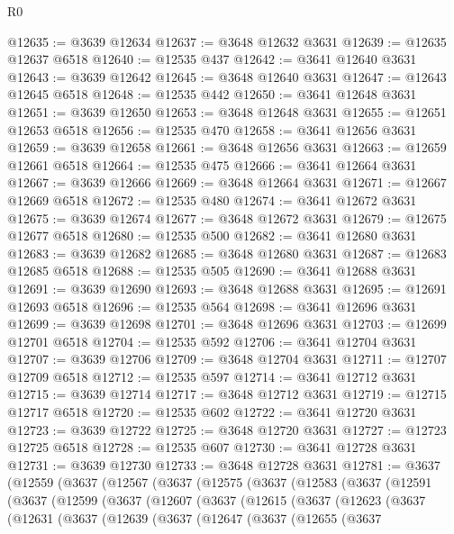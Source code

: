 \begin{lexlean}{R0}
\begin{coremodule}
@12635 := @3639 @12634
@12637 := @3648 @12632 @3631
@12639 := @12635 @12637 @6518
@12640 := @12535 @437
@12642 := @3641 @12640 @3631
@12643 := @3639 @12642
@12645 := @3648 @12640 @3631
@12647 := @12643 @12645 @6518
@12648 := @12535 @442
@12650 := @3641 @12648 @3631
@12651 := @3639 @12650
@12653 := @3648 @12648 @3631
@12655 := @12651 @12653 @6518
@12656 := @12535 @470
@12658 := @3641 @12656 @3631
@12659 := @3639 @12658
@12661 := @3648 @12656 @3631
@12663 := @12659 @12661 @6518
@12664 := @12535 @475
@12666 := @3641 @12664 @3631
@12667 := @3639 @12666
@12669 := @3648 @12664 @3631
@12671 := @12667 @12669 @6518
@12672 := @12535 @480
@12674 := @3641 @12672 @3631
@12675 := @3639 @12674
@12677 := @3648 @12672 @3631
@12679 := @12675 @12677 @6518
@12680 := @12535 @500
@12682 := @3641 @12680 @3631
@12683 := @3639 @12682
@12685 := @3648 @12680 @3631
@12687 := @12683 @12685 @6518
@12688 := @12535 @505
@12690 := @3641 @12688 @3631
@12691 := @3639 @12690
@12693 := @3648 @12688 @3631
@12695 := @12691 @12693 @6518
@12696 := @12535 @564
@12698 := @3641 @12696 @3631
@12699 := @3639 @12698
@12701 := @3648 @12696 @3631
@12703 := @12699 @12701 @6518
@12704 := @12535 @592
@12706 := @3641 @12704 @3631
@12707 := @3639 @12706
@12709 := @3648 @12704 @3631
@12711 := @12707 @12709 @6518
@12712 := @12535 @597
@12714 := @3641 @12712 @3631
@12715 := @3639 @12714
@12717 := @3648 @12712 @3631
@12719 := @12715 @12717 @6518
@12720 := @12535 @602
@12722 := @3641 @12720 @3631
@12723 := @3639 @12722
@12725 := @3648 @12720 @3631
@12727 := @12723 @12725 @6518
@12728 := @12535 @607
@12730 := @3641 @12728 @3631
@12731 := @3639 @12730
@12733 := @3648 @12728 @3631
@12781 := @3637
    (@12559
      (@3637
        (@12567
          (@3637
            (@12575
              (@3637
                (@12583
                  (@3637
                    (@12591
                      (@3637
                        (@12599
                          (@3637
                            (@12607
                              (@3637
                                (@12615
                                  (@3637
                                    (@12623
                                      (@3637
                                        (@12631
                                          (@3637
                                            (@12639
                                              (@3637
                                                (@12647
                                                  (@3637
                                                    (@12655
                                                      (@3637

\end{coremodule}
\end{lexlean}
